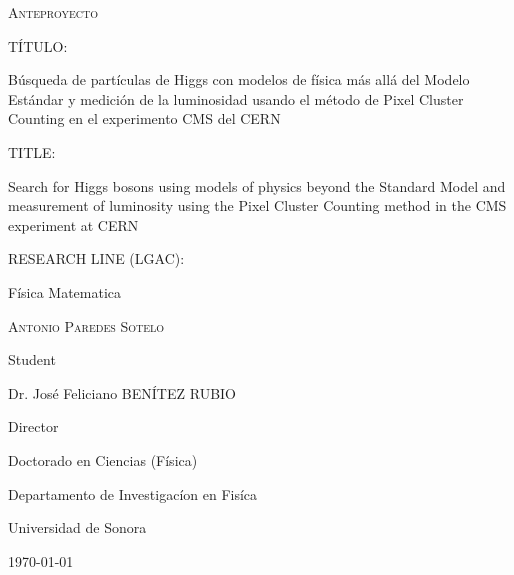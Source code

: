 \documentclass[final,3p]{CSP}
\def\Student{Antonio Paredes Sotelo}
\def\Title{Anteproyecto}
\def\Prog{Doctorado en Ciencias (F\'{i}sica) }
\def\Dept{Departamento de Investigac\'{i}on en Fis\'{i}ca}
\def\Director{Dr. Jos\'{e} Feliciano BEN\'{I}TEZ RUBIO}
\def\ProjectTitle{B\'usqueda de part\'iculas de Higgs con modelos de f\'isica m\'as all\'a del Modelo Est\'andar y medici\'on de la luminosidad usando el m\'etodo de Pixel Cluster Counting en el experimento CMS del CERN}
\def\ProjectTitleEnglish{Search for Higgs bosons using models of physics beyond the Standard Model and measurement of luminosity using the Pixel Cluster Counting method in the CMS experiment at CERN}
\def\ResearchLine{F\'{i}sica Matematica}
\begin{document}
\begin{titlepage}
  \centering
  \hspace{0pt}
  \vfill
        {\scshape\Large \Title \par}

	\vspace{1cm}
        \begin{adjustwidth}{2cm}{2cm}{
            T\'ITULO:\par
            {\large \ProjectTitle \par}
          }
          \end{adjustwidth}

        \vspace{0.5cm}
        \begin{adjustwidth}{2cm}{2cm}{
            TITLE:\par
            {\large \ProjectTitleEnglish \par}
          }
          \end{adjustwidth}
          
	\vspace{0.5cm}
        \begin{adjustwidth}{2cm}{2cm}{
            RESEARCH LINE (LGAC):  \par
            \ResearchLine \par}
        \end{adjustwidth}

        
        \vspace{4cm}
        {\underline{\hspace{8cm}}\par}
	{\scshape\large \Student \par}
        {Student\par}

        \vspace{1cm}
        {\underline{\hspace{8cm}}\par}
	{\Director \par}
        {Director\par}

        \vspace{1cm}
        {\Prog \par}
        {\Dept \par}
        {Universidad de Sonora \par}

        \vspace{4cm}
	{\today}

\hspace{0pt}
\vfill

\end{titlepage}
\end{document}
